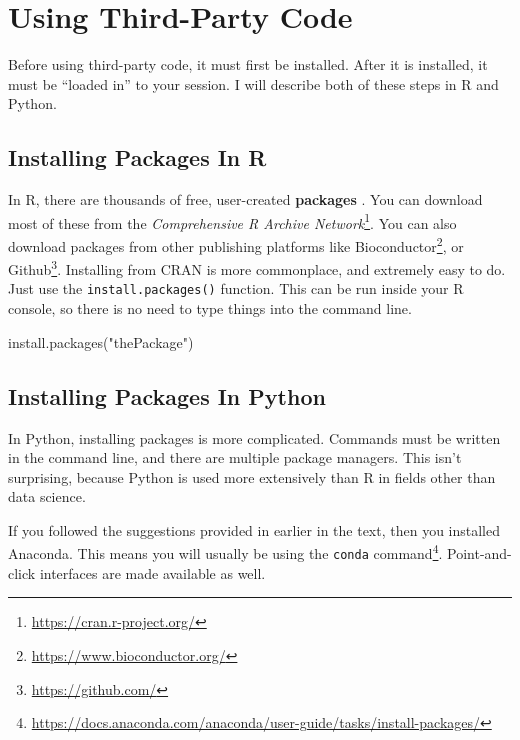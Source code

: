 \documentclass[
  12pt,
  krantz2]{krantz}
\makeatletter
\newenvironment{Shaded}{\begin{snugshade}}{\end{snugshade}}
\newcommand{\FunctionTok}[1]{\textcolor[rgb]{0,0,0}{#1}}
\newcommand{\NormalTok}[1]{#1}
\newcommand{\StringTok}[1]{\textcolor[rgb]{0.5,0.5,0.5}{#1}}
\renewcommand{\href}[2]{#2\footnote{\url{#1}}}
\newenvironment{kframe}{%
\medskip{}
\setlength{\fboxsep}{.8em}
 \def\at@end@of@kframe{}%
 \ifinner\ifhmode%
  \def\at@end@of@kframe{\end{minipage}}%
  \begin{minipage}{\columnwidth}%
 \fi\fi%
 \def\FrameCommand##1{\hskip\@totalleftmargin \hskip-\fboxsep
 \colorbox{shadecolor}{##1}\hskip-\fboxsep
     \hskip-\linewidth \hskip-\@totalleftmargin \hskip\columnwidth}%
 \MakeFramed {\advance\hsize-\width
   \@totalleftmargin\z@ \linewidth\hsize
   \@setminipage}}%
 {\par\unskip\endMakeFramed%
 \at@end@of@kframe}
\renewenvironment{Shaded}{\begin{kframe}}{\end{kframe}}
\makeatother
\begin{document}
\hypertarget{using-third-party-code}{%
\chapter{Using Third-Party Code}\label{using-third-party-code}}

Before using third-party code, it must first be installed. After it is installed, it must be ``loaded in'' to your session. I will describe both of these steps in R and Python.

\hypertarget{installing-packages-in-r}{%
\section{Installing Packages In R}\label{installing-packages-in-r}}

In R, there are thousands of free, user-created \textbf{packages} \citep{r_for_everyone}. You can download most of these from the \href{https://cran.r-project.org/}{\emph{Comprehensive R Archive Network}}. You can also download packages from other publishing platforms like \href{https://www.bioconductor.org/}{Bioconductor}, or \href{https://github.com/}{Github}. Installing from CRAN is more commonplace, and extremely easy to do. Just use the \texttt{install.packages()} function. This can be run inside your R console, so there is no need to type things into the command line.

\begin{Shaded}
\begin{Highlighting}[]
\FunctionTok{install.packages}\NormalTok{(}\StringTok{"thePackage"}\NormalTok{)}
\end{Highlighting}
\end{Shaded}

\hypertarget{installing-packages-in-python}{%
\section{Installing Packages In Python}\label{installing-packages-in-python}}

In Python, installing packages is more complicated. Commands must be written in the command line, and there are multiple package managers. This isn't surprising, because Python is used more extensively than R in fields other than data science.

If you followed the suggestions provided in earlier in the text, then you installed Anaconda. This means you will usually be using the \href{https://docs.anaconda.com/anaconda/user-guide/tasks/install-packages/}{\texttt{conda} command}. Point-and-click interfaces are made available as well.
\end{document}
